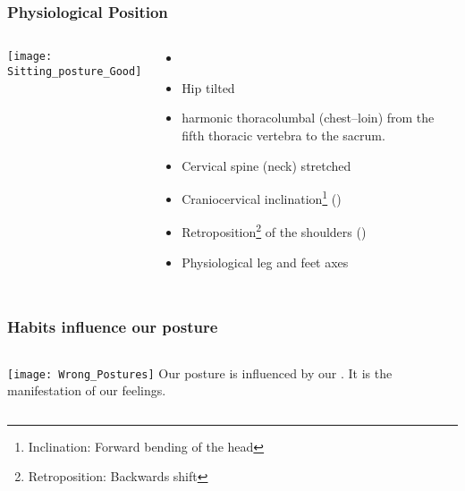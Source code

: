 \begin{frame}
\frametitle{Physiological Position}
\begin{columns}[c] %
\texttt{[image: Sitting\_posture\_Good]}

\begin{itemize}
\item[1.] 
\item[2.] Hip tilted
\item[3.] harmonic thoracolumbal (chest--loin)  from the fifth thoracic vertebra to the sacrum.
\item[4.] Cervical spine (neck) stretched
\item[5.] Craniocervical inclination\footnote{Inclination: Forward bending of the head} ()
\item[6.] Retroposition\footnote{Retroposition: Backwards shift} of the shoulders ()
\item[7.] Physiological leg and feet axes
\end{itemize}


\end{columns}
\end{frame}

\begin{frame}
\frametitle{Habits influence our posture}
\begin{columns}[c] %
\texttt{[image: Wrong\_Postures]}
Our posture is influenced by our . It is the manifestation of our feelings.
\end{columns}
\end{frame}

